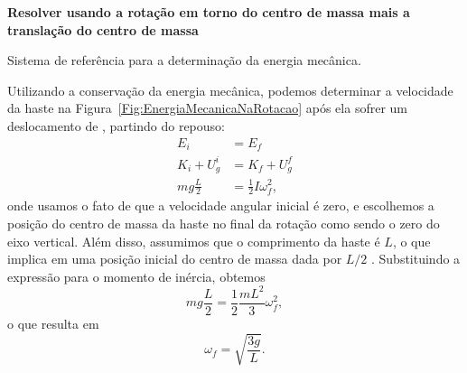 \textbf{Resolver usando a rotação em torno do centro de massa mais a translação do centro de massa}

\begin{marginfigure}
\centering
{}
\caption{Sistema de referência para a determinação da energia mecânica.}
\end{marginfigure}

Utilizando a conservação da energia mecânica, podemos determinar a velocidade da haste na Figura~\ref{Fig:EnergiaMecanicaNaRotacao} após ela sofrer um deslocamento de , partindo do repouso:
\begin{align}
    E_i &= E_f \\
    K_i + U_g^i &= K_f + U_g^f \\
    mg\frac{L}{2} &= \frac{1}{2} I \omega_f^2,
\end{align}
%
onde usamos o fato de que a velocidade angular inicial é zero, e escolhemos a posição do centro de massa da haste no final da rotação como sendo o zero do eixo vertical. Além disso, assumimos que o comprimento da haste é $L$, o que implica em uma posição inicial do centro de massa dada por $L/2$ . Substituindo a expressão para o momento de inércia, obtemos
\begin{equation}
    mg\frac{L}{2} = \frac{1}{2} \frac{mL^2}{3} \omega_f^2,
\end{equation}
%
o que resulta em
\begin{equation}
    \omega_f = \sqrt{\frac{3g}{L}}.
\end{equation}

